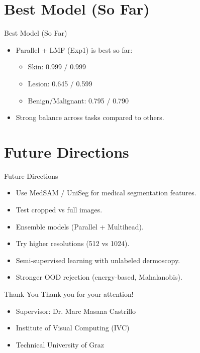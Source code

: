 \documentclass[aspectratio=169]{beamer}
\begin{document}
\section{Best Model (So Far)}

\begin{frame}{Best Model (So Far)}
  \begin{itemize}
    \item Parallel + LMF (Exp1) is best so far:
      \begin{itemize}
        \item Skin: 0.999 / 0.999
        \item Lesion: 0.645 / 0.599
        \item Benign/Malignant: 0.795 / 0.790
      \end{itemize}
    \item Strong balance across tasks compared to others.
  \end{itemize}
\end{frame}


\section{Future Directions}

\begin{frame}{Future Directions}
  \begin{itemize}
    \item Use MedSAM / UniSeg for medical segmentation features.
    \item Test cropped vs full images.
    \item Ensemble models (Parallel + Multihead).
    \item Try higher resolutions (512 vs 1024).
    \item Semi-supervised learning with unlabeled dermoscopy.
    \item Stronger OOD rejection (energy-based, Mahalanobis).
  \end{itemize}
\end{frame}

\begin{frame}{Thank You}
  \centering
  \Large Thank you for your attention!
  
  \vspace{1cm}
  \normalsize
  \begin{itemize}
    \item Supervisor: Dr. Marc Masana Castrillo
    \item Institute of Visual Computing (IVC)
    \item Technical University of Graz
  \end{itemize}
\end{frame}
\end{document}
